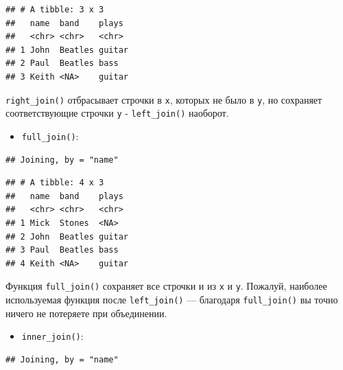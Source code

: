 \documentclass[]{book}
\newenvironment{Shaded}{\begin{snugshade}}{\end{snugshade}}
\newcommand{\KeywordTok}[1]{\textcolor[rgb]{0.13,0.29,0.53}{\textbf{#1}}}
\newcommand{\StringTok}[1]{\textcolor[rgb]{0.31,0.60,0.02}{#1}}
\newcommand{\OperatorTok}[1]{\textcolor[rgb]{0.81,0.36,0.00}{\textbf{#1}}}
\newcommand{\NormalTok}[1]{#1}
\providecommand{\tightlist}{%
  \setlength{\itemsep}{0pt}\setlength{\parskip}{0pt}}
\begin{document}
\begin{verbatim}
## # A tibble: 3 x 3
##   name  band    plays 
##   <chr> <chr>   <chr> 
## 1 John  Beatles guitar
## 2 Paul  Beatles bass  
## 3 Keith <NA>    guitar
\end{verbatim}

\texttt{right\_join()} отбрасывает строчки в \texttt{x}, которых не было
в \texttt{y}, но сохраняет соответствующие строчки \texttt{y} -
\texttt{left\_join()} наоборот.

\begin{itemize}
\tightlist
\item
  \texttt{full\_join()}:
\end{itemize}

\begin{Shaded}
\end{Shaded}

\begin{verbatim}
## Joining, by = "name"
\end{verbatim}

\begin{verbatim}
## # A tibble: 4 x 3
##   name  band    plays 
##   <chr> <chr>   <chr> 
## 1 Mick  Stones  <NA>  
## 2 John  Beatles guitar
## 3 Paul  Beatles bass  
## 4 Keith <NA>    guitar
\end{verbatim}

Функция \texttt{full\_join()} сохраняет все строчки и из \texttt{x} и
\texttt{y}. Пожалуй, наиболее используемая функция после
\texttt{left\_join()} --- благодаря \texttt{full\_join()} вы точно
ничего не потеряете при объединении.

\begin{itemize}
\tightlist
\item
  \texttt{inner\_join()}:
\end{itemize}

\begin{Shaded}
\end{Shaded}

\begin{verbatim}
## Joining, by = "name"
\end{verbatim}
\end{document}
